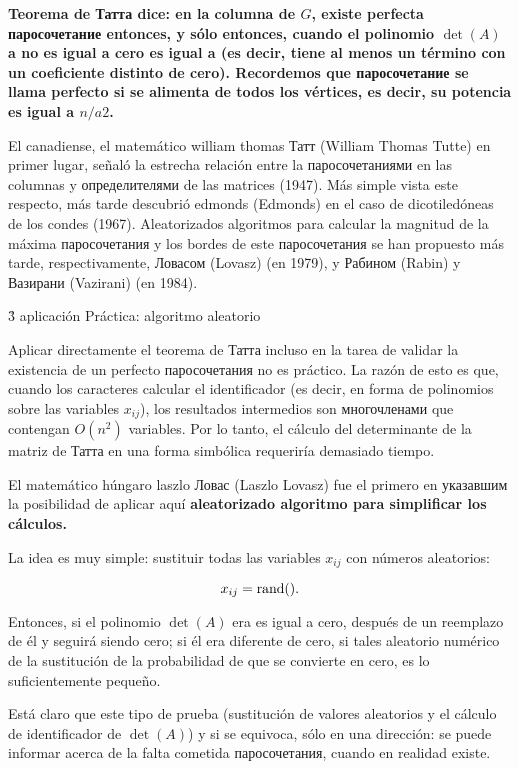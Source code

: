 \bf{Teorema de Татта} dice: en la columna de $G$, existe perfecta паросочетание entonces, y sólo entonces, cuando el polinomio $\det(A)$ a no es igual a cero es igual a (es decir, tiene al menos un término con un coeficiente distinto de cero). Recordemos que паросочетание se llama perfecto si se alimenta de todos los vértices, es decir, su potencia es igual a $n/a 2$.

El canadiense, el matemático william thomas Татт (William Thomas Tutte) en primer lugar, señaló la estrecha relación entre la паросочетаниями en las columnas y определителями de las matrices (1947). Más simple vista este respecto, más tarde descubrió edmonds (Edmonds) en el caso de dicotiledóneas de los condes (1967). Aleatorizados algoritmos para calcular la magnitud de la máxima паросочетания y los bordes de este паросочетания se han propuesto más tarde, respectivamente, Ловасом (Lovasz) (en 1979), y Рабином (Rabin) y Вазирани (Vazirani) (en 1984).


\h3{ aplicación Práctica: algoritmo aleatorio }

Aplicar directamente el teorema de Татта incluso en la tarea de validar la existencia de un perfecto паросочетания no es práctico. La razón de esto es que, cuando los caracteres calcular el identificador (es decir, en forma de polinomios sobre las variables $x_{ij}$), los resultados intermedios son многочленами que contengan $O(n^2)$ variables. Por lo tanto, el cálculo del determinante de la matriz de Татта en una forma simbólica requeriría demasiado tiempo.

El matemático húngaro laszlo Ловас (Laszlo Lovasz) fue el primero en указавшим la posibilidad de aplicar aquí \bf{aleatorizado} algoritmo para simplificar los cálculos.

La idea es muy simple: sustituir todas las variables $x_{ij}$ con números aleatorios:

$$ x_{ij} = {\rm rand}(). $$

Entonces, si el polinomio $\det(A)$ era es igual a cero, después de un reemplazo de él y seguirá siendo cero; si él era diferente de cero, si tales aleatorio numérico de la sustitución de la probabilidad de que se convierte en cero, es lo suficientemente pequeño.

Está claro que este tipo de prueba (sustitución de valores aleatorios y el cálculo de identificador de $\det(A)$) y si se equivoca, sólo en una dirección: se puede informar acerca de la falta cometida паросочетания, cuando en realidad existe.

